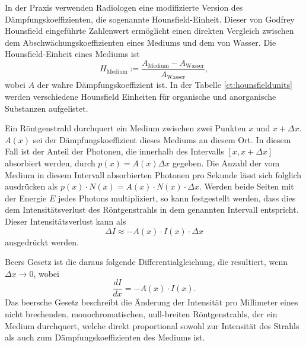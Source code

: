 In der Praxis verwenden Radiologen eine modifizierte Version des Dämpfungskoeffizienten, die sogenannte Hounsfield-Einheit. Dieser von Godfrey Hounsfield eingeführte Zahlenwert ermöglicht einen direkten Vergleich zwischen dem Abschwächungskoeffizienten eines Mediums und dem von Wasser. Die Hounsfield-Einheit eines Mediums ist
\begin{equation}
	H_{\text{Medium}} := \dfrac{A_{\text{Medium}}-A_{\text{Wasser}}}{A_{\text{Wasser}}},
\end{equation}
wobei $A$ der wahre Dämpfungskoeffizient ist. In der Tabelle \ref{ct:hounsfieldunits} werden verschiedene Hounsfield Einheiten für organische und anorganische Substanzen aufgelistet.

Ein Röntgenstrahl durchquert ein Medium zwischen zwei Punkten $x$ und $x + \Delta x$. $A(x)$ sei der Dämpfungskoeffizient dieses Mediums an diesem Ort. In diesem Fall ist der Anteil der Photonen, die innerhalb des Intervalls $[x, x + \Delta x]$ absorbiert werden, durch $p(x) = A(x)\Delta x$ gegeben. Die Anzahl der vom Medium in diesem Intervall absorbierten Photonen pro Sekunde lässt sich folglich ausdrücken als $p(x) \cdot N(x) = A(x) \cdot N(x) \cdot \Delta x$. Werden beide Seiten mit der Energie $E$ jedes Photons multipliziert, so kann festgestellt werden, dass dies dem Intensitätsverlust des Röntgenstrahls in dem genannten Intervall entspricht. Dieser Intensitätsverlust kann als 
\begin{equation}
	\Delta I \approx -A(x) \cdot I(x) \cdot \Delta x
\end{equation}
ausgedrückt werden.

Beers Gesetz ist die daraus folgende Differentialgleichung, die resultiert, wenn $\Delta x \rightarrow 0$, wobei 
\begin{equation}
	\dfrac{dI}{dx} = -A(x)\cdot I(x).
\end{equation}
Das beersche Gesetz beschreibt die Änderung der Intensität pro Millimeter eines nicht brechenden, monochromatischen, null-breiten Röntgenstrahls, der ein Medium durchquert, welche direkt proportional sowohl zur Intensität des Strahls als auch zum Dämpfungskoeffizienten des Mediums ist.

